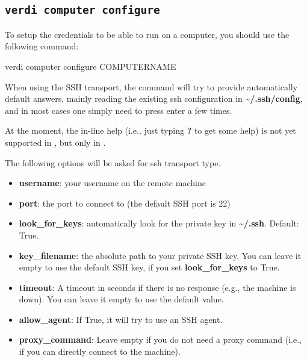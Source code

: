 \begin{appendices}
\begin{itemize}
\end{itemize}

\subsection{\label{sec:computerconfigure}\texttt{verdi computer configure}}
To setup the credentials to be able to run on a computer, you should use the following command:
\begin{bashcommand}
verdi computer configure COMPUTERNAME
\end{bashcommand}

When using the SSH transport, the command will try to provide automatically default answers, mainly reading
the existing ssh configuration in \textbf{\textasciitilde{}/.ssh/config}, and in most cases one
simply need to press enter a few times.

At the moment, the in-line help (i.e., just typing \textbf{?} to get
some help) is not yet supported in , but only in
.

The following options will be asked for ssh transport type.

\begin{itemize}
\item {} 
\textbf{username}: your username on the remote machine

\item {} 
\textbf{port}: the port to connect to (the default SSH port is 22)

\item {} 
\textbf{look\_for\_keys}: automatically look for the private key in \textbf{\textasciitilde{}/.ssh}.
Default: True.

\item {} 
\textbf{key\_filename}: the absolute path to your private SSH key. You can leave
it empty to use the default SSH key, if you set \textbf{look\_for\_keys} to True.

\item {} 
\textbf{timeout}: A timeout in seconds if there is no response (e.g., the
machine is down). You can leave it empty to use the default value.

\item {} 
\textbf{allow\_agent}: If True, it will try to use an SSH agent.

\item {} 
\textbf{proxy\_command}: Leave empty if you do not need a proxy command (i.e.,
if you can directly connect to the machine).


\end{itemize}
\end{appendices}

